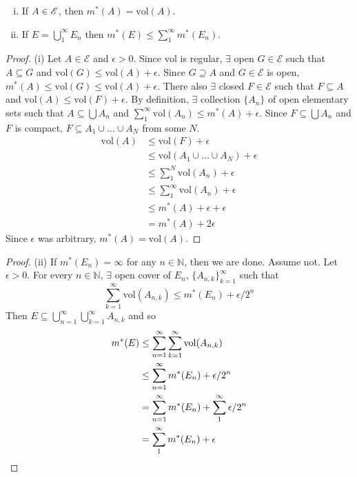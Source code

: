 \documentclass[11pt]{article}
\begin{document}
\begin{theorem} $\text{}$
  \begin{enumerate} [(i), nosep, left=0pt]
  \item If $A \in \mathscr{E}$, then $m^{*}(A) = \mathrm{vol}(A)$.
  \item If $E = \bigcup_{1}^{\infty} E_{n}$ then $m^{*}(E) \le \sum_{1}^{\infty} m^{*}(E_{n})$.
  \end{enumerate}
\end{theorem}

\begin{proof}
  (i) Let $A \in \mathscr{E}$ and $\epsilon > 0$. Since $\mathrm{vol}$ is regular, $\exists$ open $G \in \mathscr{E}$ such that $A \subseteq G$ and $\mathrm{vol}(G) \le \mathrm{vol}(A) + \epsilon$. Since $G \supseteq A$ and $G \in \mathscr{E}$ is open, $m^*(A) \le \mathrm{vol}(G) \le \mathrm{vol}(A) + \epsilon$. There also $\exists$ closed $F \in \mathscr{E}$ such that $F \subseteq A$ and $\mathrm{vol}(A) \le \mathrm{vol}(F) + \epsilon$. By definition, $\exists$ collection $\{ A_n \}$ of open elementary sets such that $A \subseteq \bigcup A_n$ and $\sum_1^\infty \mathrm{vol}(A_n) \le m^*(A) + \epsilon$. Since $F \subseteq \bigcup A_n$ and $F$ is compact, $F\subseteq A_1 \cup \dots \cup A_N$ from some $N$. 
  \begin{align*} \mathrm{vol}(A) & \le \mathrm{vol}(F) + \epsilon \\ & \le \mathrm{vol}(A_1 \cup \dots \cup A_N) + \epsilon \\ & \le \sum_1^N \mathrm{vol}(A_n) + \epsilon \\ & \le \sum_1^\infty \mathrm{vol}(A_n) + \epsilon \\ & \le m^* (A) + \epsilon + \epsilon \\ & = m^* (A) + 2 \epsilon  \end{align*} Since $\epsilon$ was arbitrary, $m^*(A) = \mathrm{vol}(A)$.
\end{proof}
\begin{proof}
    (ii)  If $m^* (E_n) = \infty$ for any $n \in \mathbb{N}$, then we are done. Assume not. Let $\epsilon > 0$. For every $n \in \mathbb{N}$, $\exists$ open cover of $E_n$, $\{ A_{n, k} \}_{k = 1}^\infty$ such that $$\sum_{k = 1}^\infty \mathrm{vol}(A_{n, k}) \le m^* (E_n) + \epsilon / 2^n$$Then $E \subseteq \bigcup_{n = 1}^\infty \bigcup_{k = 1}^\infty A_{n, k}$ and so \begin{align*}
            m^*(E) & \le \sum_{n = 1}^\infty \sum_{k = 1}^\infty \mathrm{vol}(A_{n, k}) \\
            & \le \sum_{n = 1}^\infty m^*(E_n) + \epsilon / 2^n \\ & = \sum_{n = 1}^\infty m^*(E_n) + \sum_1^\infty \epsilon / 2^n \\
            & = \sum_1^\infty m^*(E_n) + \epsilon \qedhere
      \end{align*}
\end{proof}
\end{document}
